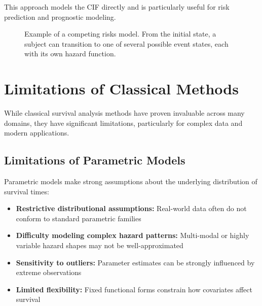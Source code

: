 This approach models the CIF directly and is particularly useful for risk prediction and prognostic modeling.

\begin{figure}[htbp]
    \centering
    \caption{Example of a competing risks model. From the initial state, a subject can transition to one of several possible event states, each with its own hazard function.}
    \label{fig:competing-risks-model}
\end{figure}

\section{Limitations of Classical Methods}

While classical survival analysis methods have proven invaluable across many domains, they have significant limitations, particularly for complex data and modern applications.

\subsection{Limitations of Parametric Models}

Parametric models make strong assumptions about the underlying distribution of survival times:
\begin{itemize}
    \item \textbf{Restrictive distributional assumptions:} Real-world data often do not conform to standard parametric families
    \item \textbf{Difficulty modeling complex hazard patterns:} Multi-modal or highly variable hazard shapes may not be well-approximated
    \item \textbf{Sensitivity to outliers:} Parameter estimates can be strongly influenced by extreme observations
    \item \textbf{Limited flexibility:} Fixed functional forms constrain how covariates affect survival
\end{itemize}

